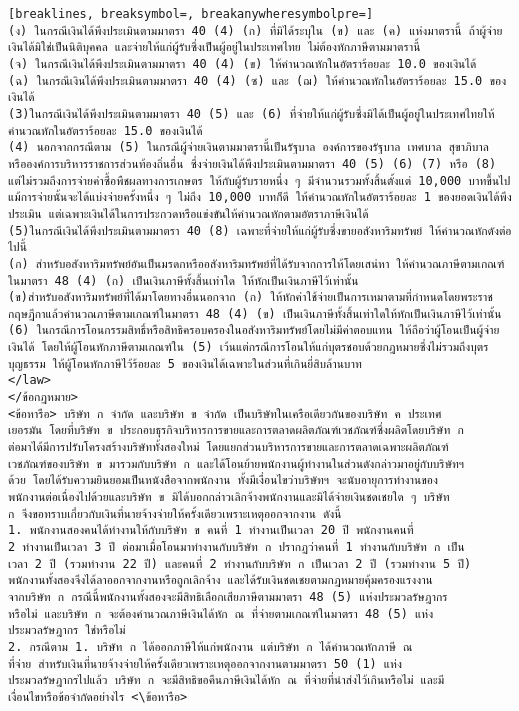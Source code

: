 \begin{Verbatim}[breaklines, breaksymbol=, breakanywheresymbolpre=]
(ง) ในกรณีเงินได้พึงประเมินตามมาตรา 40 (4) (ก) ที่มิได้ระบุใน (ข) และ (ค) แห่งมาตรานี้ ถ้าผู้จ่ายเงินได้มิใช่เป็นนิติบุคคล และจ่ายให้แก่ผู้รับซึ่งเป็นผู้อยู่ในประเทศไทย ไม่ต้องหักภาษีตามมาตรานี้
(จ) ในกรณีเงินได้พึงประเมินตามมาตรา 40 (4) (ข) ให้คำนวณหักในอัตราร้อยละ 10.0 ของเงินได้
(ฉ) ในกรณีเงินได้พึงประเมินตามมาตรา 40 (4) (ซ) และ (ฌ) ให้คำนวณหักในอัตราร้อยละ 15.0 ของเงินได้
(3)ในกรณีเงินได้พึงประเมินตามมาตรา 40 (5) และ (6) ที่จ่ายให้แก่ผู้รับซึ่งมิได้เป็นผู้อยู่ในประเทศไทยให้คำนวณหักในอัตราร้อยละ 15.0 ของเงินได้
(4) นอกจากกรณีตาม (5) ในกรณีผู้จ่ายเงินตามมาตรานี้เป็นรัฐบาล องค์การของรัฐบาล เทศบาล สุขาภิบาล หรือองค์การบริหารราชการส่วนท้องถิ่นอื่น ซึ่งจ่ายเงินได้พึงประเมินตามมาตรา 40 (5) (6) (7) หรือ (8) แต่ไม่รวมถึงการจ่ายค่าซื้อพืชผลทางการเกษตร ให้กับผู้รับรายหนึ่ง ๆ มีจำนวนรวมทั้งสิ้นตั้งแต่ 10,000 บาทขึ้นไป แม้การจ่ายนั้นจะได้แบ่งจ่ายครั้งหนึ่ง ๆ ไม่ถึง 10,000 บาทก็ดี ให้คำนวณหักในอัตราร้อยละ 1 ของยอดเงินได้พึงประเมิน แต่เฉพาะเงินได้ในการประกวดหรือแข่งขันให้คำนวณหักตามอัตราภาษีเงินได้
(5)ในกรณีเงินได้พึงประเมินตามมาตรา 40 (8) เฉพาะที่จ่ายให้แก่ผู้รับซึ่งขายอสังหาริมทรัพย์ ให้คำนวณหักดังต่อไปนี้
(ก) สำหรับอสังหาริมทรัพย์อันเป็นมรดกหรืออสังหาริมทรัพย์ที่ได้รับจากการให้โดยเสน่หา ให้คำนวณภาษีตามเกณฑ์ในมาตรา 48 (4) (ก) เป็นเงินภาษีทั้งสิ้นเท่าใด ให้หักเป็นเงินภาษีไว้เท่านั้น
(ข)สำหรับอสังหาริมทรัพย์ที่ได้มาโดยทางอื่นนอกจาก (ก) ให้หักค่าใช้จ่ายเป็นการเหมาตามที่กำหนดโดยพระราชกฤษฎีกาแล้วคำนวณภาษีตามเกณฑ์ในมาตรา 48 (4) (ข) เป็นเงินภาษีทั้งสิ้นเท่าใดให้หักเป็นเงินภาษีไว้เท่านั้น
(6) ในกรณีการโอนกรรมสิทธิ์หรือสิทธิครอบครองในอสังหาริมทรัพย์โดยไม่มีค่าตอบแทน ให้ถือว่าผู้โอนเป็นผู้จ่ายเงินได้ โดยให้ผู้โอนหักภาษีตามเกณฑ์ใน (5) เว้นแต่กรณีการโอนให้แก่บุตรชอบด้วยกฎหมายซึ่งไม่รวมถึงบุตรบุญธรรม ให้ผู้โอนหักภาษีไว้ร้อยละ 5 ของเงินได้เฉพาะในส่วนที่เกินยี่สิบล้านบาท
</law>
</ข้อกฎหมาย>
<ข้อหารือ> บริษัท ก จำกัด และบริษัท ข จำกัด เป็นบริษัทในเครือเดียวกันของบริษัท ค ประเทศ
เยอรมัน โดยที่บริษัท ข ประกอบธุรกิจบริหารการขายและการตลาดผลิตภัณฑ์เวชภัณฑ์ซึ่งผลิตโดยบริษัท ก
ต่อมาได้มีการปรับโครงสร้างบริษัททั้งสองใหม่ โดยแยกส่วนบริหารการขายและการตลาดเฉพาะผลิตภัณฑ์
เวชภัณฑ์ของบริษัท ข มารวมกับบริษัท ก และได้โอนย้ายพนักงานผู้ทำงานในส่วนดังกล่าวมาอยู่กับบริษัทฯ
ด้วย โดยได้รับความยินยอมเป็นหนังสือจากพนักงาน ทั้งมีเงื่อนไขว่าบริษัทฯ จะนับอายุการทำงานของ
พนักงานต่อเนื่องไปด้วยและบริษัท ข มิได้บอกกล่าวเลิกจ้างพนักงานและมิได้จ่ายเงินชดเชยใด ๆ บริษัท
ก จึงขอทราบเกี่ยวกับเงินที่นายจ้างจ่ายให้ครั้งเดียวเพราะเหตุออกจากงาน ดังนี้
1. พนักงานสองคนได้ทำงานให้กับบริษัท ข คนที่ 1 ทำงานเป็นเวลา 20 ปี พนักงานคนที่
2 ทำงานเป็นเวลา 3 ปี ต่อมาเมื่อโอนมาทำงานกับบริษัท ก ปรากฏว่าคนที่ 1 ทำงานกับบริษัท ก เป็น
เวลา 2 ปี (รวมทำงาน 22 ปี) และคนที่ 2 ทำงานกับบริษัท ก เป็นเวลา 2 ปี (รวมทำงาน 5 ปี)
พนักงานทั้งสองจึงได้ลาออกจากงานหรือถูกเลิกจ้าง และได้รับเงินชดเชยตามกฎหมายคุ้มครองแรงงาน
จากบริษัท ก กรณีนี้พนักงานทั้งสองจะมีสิทธิเลือกเสียภาษีตามมาตรา 48 (5) แห่งประมวลรัษฎากร
หรือไม่ และบริษัท ก จะต้องคำนวณภาษีเงินได้หัก ณ ที่จ่ายตามเกณฑ์ในมาตรา 48 (5) แห่ง
ประมวลรัษฎากร ใช่หรือไม่
2. กรณีตาม 1. บริษัท ก ได้ออกภาษีให้แก่พนักงาน แต่บริษัท ก ได้คำนวณหักภาษี ณ
ที่จ่าย สำหรับเงินที่นายจ้างจ่ายให้ครั้งเดียวเพราะเหตุออกจากงานตามมาตรา 50 (1) แห่ง
ประมวลรัษฎากรไปแล้ว บริษัท ก จะมีสิทธิขอคืนภาษีเงินได้หัก ณ ที่จ่ายที่นำส่งไว้เกินหรือไม่ และมี
เงื่อนไขหรือข้อจำกัดอย่างไร <\ข้อหารือ>


\end{Verbatim}
